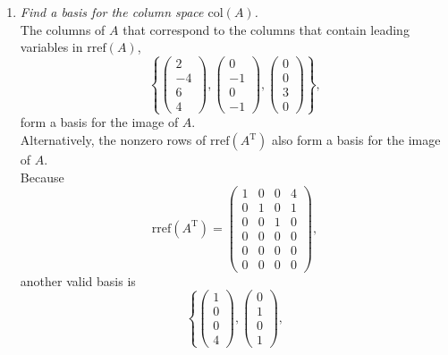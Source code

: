 \documentclass[12pt]{article}
\begin{document}
\begin{enumerate}[label=(\alph*)]
	\item \textit{Find a basis for the column space $\text{col}(A)$.}
	\\[\baselineskip]
	The columns of $A$ that correspond to the columns that contain leading
	variables in $\text{rref}(A)$,
	\begin{equation*}
		\boxed{
			\left\{
				\begin{pmatrix} 2 \\ -4 \\ 6 \\ 4 \end{pmatrix},
				\begin{pmatrix} 0 \\ -1 \\ 0 \\ -1 \end{pmatrix},
				\begin{pmatrix} 0 \\ 0 \\ 3 \\ 0 \end{pmatrix}
			\right\}
		}
		,
	\end{equation*}
	form a basis for the image of $A$. \\[\baselineskip]
	Alternatively, the nonzero rows of $\text{rref}(A^\text{T})$ also form a
	basis for the image of $A$. \\
	Because
	\begin{equation*}
		\text{rref}(A^\text{T})
		=
		\begin{pmatrix}
			1 & 0 & 0 & 4 \\
			0 & 1 & 0 & 1 \\
			0 & 0 & 1 & 0 \\
			0 & 0 & 0 & 0 \\
			0 & 0 & 0 & 0 \\
			0 & 0 & 0 & 0
		\end{pmatrix}
		,
	\end{equation*}
	another valid basis is
	\begin{equation*}
		\boxed{
			\left\{
				\begin{pmatrix} 1 \\ 0 \\ 0 \\ 4 \end{pmatrix},
				\begin{pmatrix} 0 \\ 1 \\ 0 \\ 1 \end{pmatrix},
}
\end{equation*}
\end{enumerate}
\end{document}
